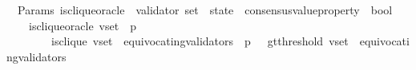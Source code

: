 \begin{isabellebody}
\isanewline
\isanewline
{}\isamarkupfalse%
\ {\isacharparenleft}\ Params{\isacharparenright}\ is{\isacharunderscore}clique{\isacharunderscore}oracle\ {\isacharcolon}{\isacharcolon}\ {\isachardoublequoteopen}{\isacharparenleft}validator\ set\ {\isacharasterisk}\ state\ {\isacharasterisk}\ consensus{\isacharunderscore}value{\isacharunderscore}property{\isacharparenright}\ {\isasymRightarrow}\ bool{\isachardoublequoteclose}\isanewline
\ \ \isanewline
\ \ \ \ {\isachardoublequoteopen}is{\isacharunderscore}clique{\isacharunderscore}oracle\ {\isacharparenleft}v{\isacharunderscore}set{\isacharcomma}\ {\isasymsigma}{\isacharcomma}\ p{\isacharparenright}\isanewline
\ \ \ \ \ \ \ {\isacharequal}\ {\isacharparenleft}is{\isacharunderscore}clique\ {\isacharparenleft}v{\isacharunderscore}set\ {\isacharminus}\ {\isacharparenleft}equivocating{\isacharunderscore}validators\ {\isasymsigma}{\isacharparenright}{\isacharcomma}\ p{\isacharcomma}\ {\isasymsigma}{\isacharparenright}\ {\isasymand}\ gt{\isacharunderscore}threshold\ {\isacharparenleft}v{\isacharunderscore}set\ {\isacharminus}\ {\isacharparenleft}equivocating{\isacharunderscore}validators\ {\isasymsigma}{\isacharparenright}{\isacharcomma}\ {\isasymsigma}{\isacharparenright}{\isacharparenright}{\isachardoublequoteclose}\isanewline
%
\isadelimtheory
\isanewline
%
\endisadelimtheory
%
\isatagtheory
{}\isamarkupfalse%
%
\endisatagtheory
{\isafoldtheory}%
%
\isadelimtheory
%
\endisadelimtheory
%
\end{isabellebody}%
\endinput

